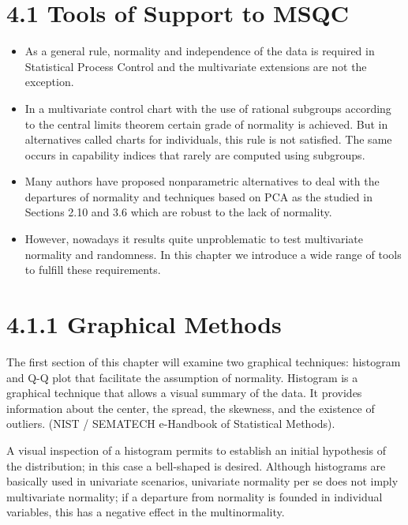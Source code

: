 \documentclass[]{beamer}
\begin{document}

\section{4.1 Tools of Support to MSQC}
\begin{frame}[fragile]
\begin{itemize}
	\item As a general rule, normality and independence of the data is required in Statistical Process Control and the multivariate extensions are not the exception. 
	
	\item In a multivariate control chart with the use of rational subgroups according to the central limits theorem certain grade of normality is achieved. But in alternatives called charts for individuals, this rule is not satisfied. The same occurs in capability indices that rarely are computed using subgroups.
	
	\item Many authors have proposed nonparametric alternatives to deal with the
	departures of normality and techniques based on PCA as the studied in Sections 2.10 and 3.6 which are robust to the lack of normality.
	\item However, nowadays it results quite unproblematic to test multivariate normality and randomness. In this chapter we introduce a wide range of tools to fulfill these requirements.
\end{itemize}
\end{frame}


\section{4.1.1 Graphical Methods}
\begin{frame}
The first section of this chapter will examine two graphical techniques: histogram
and Q-Q plot that facilitate the assumption of normality.
Histogram is a graphical technique that allows a visual summary of the data. It
provides information about the center, the spread, the skewness, and the existence
of outliers. (NIST / SEMATECH e-Handbook of Statistical Methods).
\end{frame}
\begin{frame}[fragile]
A visual inspection of a histogram permits to establish an initial hypothesis of
the distribution; in this case a bell-shaped is desired.
Although histograms are basically used in univariate scenarios, univariate
normality per se does not imply multivariate normality; if a departure from normality
is founded in individual variables, this has a negative effect in the
multinormality.
\end{frame}
\end{document}

